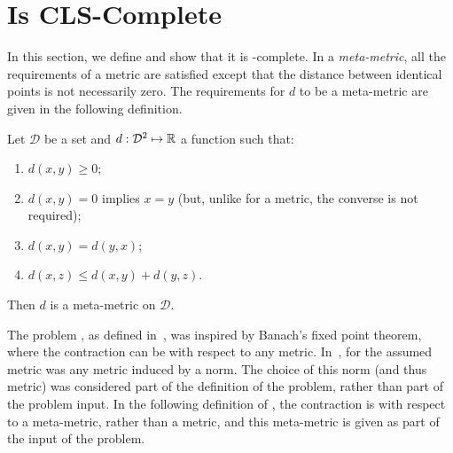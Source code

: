 \chapter{\MMCM Is CLS-Complete}
\label{sec:MMCMisCLScomplete}

In this section, we define \MMCM and show that it is \CLS-complete.
In a \emph{meta-metric}, all the requirements of a metric are satisfied except
that the distance between identical points is not necessarily zero. The
requirements for $d$ to be a meta-metric are given in the following definition.

\begin{definition}
\label{def:metametric}
Let $\mathcal{D}$ be a set and $d:\mathcal{D}^2 \mapsto \mathbb{R}$ a function such that:
\begin{enumerate}
\item $d(x, y) \ge 0$;
\item $d(x, y) = 0$ implies $x = y$ (but, unlike for a metric, the converse is not required);
\item $d(x, y) = d(y, x)$;
\item $d(x, z) \le d(x, y) + d(y, z)$.
\end{enumerate}
Then $d$ is a meta-metric on $\mathcal{D}$.
\end{definition}

The problem \CM, as defined in~\cite{daskalakis2011continuous}, was inspired by
Banach's fixed point theorem, where the contraction can be with respect to any
metric.  In~\cite{daskalakis2011continuous}, for \CM the assumed metric was any
metric induced by a norm. The choice of this norm (and thus metric) was
considered part of the definition of the problem, rather than part of the
problem input. In the following definition of \MMCM, the contraction is with
respect to a meta-metric, rather than a metric, and this meta-metric is given as part of the input of
the problem.

